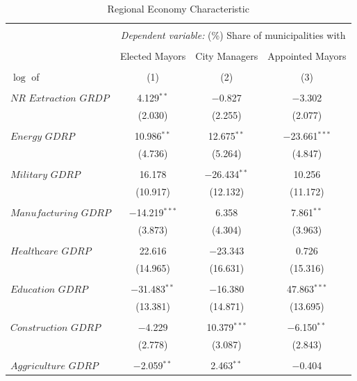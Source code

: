 \documentclass[12pt]{article}
\numberwithin{equation}{section}
\numberwithin{table}{section}
\numberwithin{figure}{section}
\begin{document}
\begin{table}[!htbp] \centering \footnotesize
\begin{threeparttable}
    \caption{Regional Economy Characteristic} 
    \label{} 
  \begin{tabular}{@{\extracolsep{5pt}}lccc} 
  \\[-1.8ex]\hline 
  \hline \\[-1.8ex] 
   & \multicolumn{3}{c}{\textit{Dependent variable:}  (\%) Share of municipalities with} \\ 
  \cline{2-4} 
  \\[-1.8ex] & Elected Mayors & City Managers & Appointed Mayors\\ 
  \\[-1.8ex] $\log$ of& (1) & (2) & (3)\\ 
  \hline \\[-1.8ex]
  $\textit{NR Extraction GRDP}$ & 4.129$^{**}$ & $-$0.827 & $-$3.302 \\ 
  & (2.030) & (2.255) & (2.077) \\ 
  & & & \\ 
  $\textit{Energy GDRP}$ & 10.986$^{**}$ & 12.675$^{**}$ & $-$23.661$^{***}$ \\ 
  & (4.736) & (5.264) & (4.847) \\ 
  & & & \\ 
 $\textit{Military GDRP}$ & 16.178 & $-$26.434$^{**}$ & 10.256 \\ 
  & (10.917) & (12.132) & (11.172) \\ 
  & & & \\ 
 $\textit{Manufacturing GDRP}$ & $-$14.219$^{***}$ & 6.358 & 7.861$^{**}$ \\ 
  & (3.873) & (4.304) & (3.963) \\ 
  & & & \\ 
 $\textit{Healthcare GDRP}$ & 22.616 & $-$23.343 & 0.726 \\ 
  & (14.965) & (16.631) & (15.316) \\ 
  & & & \\ 
 $\textit{Education GDRP}$ & $-$31.483$^{**}$ & $-$16.380 & 47.863$^{***}$ \\ 
  & (13.381) & (14.871) & (13.695) \\ 
  & & & \\ 
 $\textit{Construction GDRP}$ & $-$4.229 & 10.379$^{***}$ & $-$6.150$^{**}$ \\ 
  & (2.778) & (3.087) & (2.843) \\ 
  & & & \\ 
 $\textit{Aggriculture GDRP}$ & $-$2.059$^{**}$ & 2.463$^{**}$ & $-$0.404 \\ 

\end{tabular}
\end{threeparttable}
\end{table}
\end{document}
